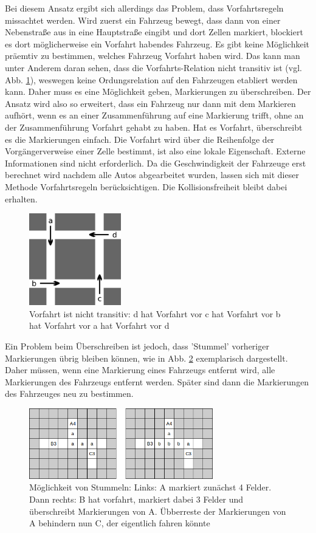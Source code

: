 \documentclass[10pt, a4paper]{article}
\begin{document}
Bei diesem Ansatz ergibt sich allerdings das Problem, dass Vorfahrtsregeln missachtet werden. Wird zuerst ein Fahrzeug bewegt, dass dann von einer Nebenstraße aus in eine Hauptstraße eingibt und dort Zellen markiert, blockiert es dort möglicherweise ein Vorfahrt habendes Fahrzeug. Es gibt keine Möglichkeit präemtiv zu bestimmen, welches Fahrzeug Vorfahrt haben wird. Das kann man unter Anderem daran sehen, dass die Vorfahrts-Relation nicht transitiv ist (vgl. Abb. \ref{fig:rightOfWayNotTransitive}), weswegen keine Ordungsrelation auf den Fahrzeugen etabliert werden kann. Daher muss es eine Möglichkeit geben, Markierungen zu überschreiben. Der Ansatz wird also so erweitert, dass ein Fahrzeug nur dann mit dem Markieren aufhört, wenn es an einer Zusammenführung auf eine Markierung trifft, ohne an der Zusammenführung Vorfahrt gehabt zu haben. Hat es Vorfahrt, überschreibt es die Markierungen einfach. Die Vorfahrt wird über die Reihenfolge der Vorgängerverweise einer Zelle bestimmt, ist also eine lokale Eigenschaft. Externe Informationen sind nicht erforderlich. Da die Geschwindigkeit der Fahrzeuge erst berechnet wird nachdem alle Autos abgearbeitet wurden, lassen sich mit dieser Methode Vorfahrtsregeln berücksichtigen. Die Kollisionsfreiheit bleibt dabei erhalten.
\begin{figure}[h!]
	\centering
	\includegraphics[width=4cm]{img/rightOfWay}
	\caption{Vorfahrt ist nicht transitiv: d hat Vorfahrt vor c hat Vorfahrt vor b hat Vorfahrt vor a hat Vorfahrt vor d}
	\label{fig:rightOfWayNotTransitive}
\end{figure}

Ein Problem beim Überschreiben ist jedoch, dass 'Stummel' vorheriger Markierungen übrig bleiben können, wie in Abb. \ref{fig:overwritingCanCauseStubs} exemplarisch dargestellt. Daher müssen, wenn eine Markierung eines Fahrzeugs entfernt wird, alle Markierungen des Fahrzeugs entfernt werden. Später sind dann die Markierungen des Fahrzeuges neu zu bestimmen.
\begin{figure}[h!]
	\centering
	\includegraphics[width=8cm]{img/stubs}
	\caption{Möglichkeit von Stummeln: Links: A markiert zunächst 4 Felder. Dann rechts: B hat vorfahrt, markiert dabei 3 Felder und überschreibt Markierungen von A. Übberreste der Markierungen von A behindern nun C, der eigentlich fahren könnte}
	\label{fig:overwritingCanCauseStubs}
\end{figure}
\end{document}
